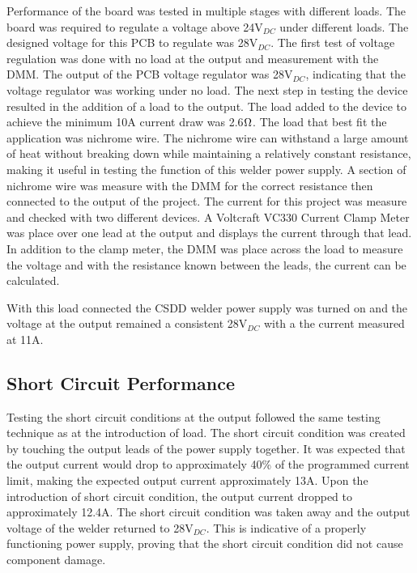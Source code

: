 \documentclass[11pt]{article}
\begin{document}
       Performance of the board was tested in multiple stages with different loads. The board was required to regulate a voltage above 24V$_{DC}$ under different loads. The designed voltage for this PCB to regulate was 28V$_{DC}$. The first test of voltage regulation was done with no load at the output and measurement with the DMM. The output of the PCB voltage regulator was 28V$_{DC}$, indicating that the voltage regulator was working under no load. The next step in testing the device resulted in the addition of a load to the output. The load added to the device to achieve the minimum 10A current draw was 2.6$\ohm$. The load that best fit the application was nichrome wire. The nichrome wire can withstand a large amount of heat without breaking down while maintaining a relatively constant resistance, making it useful in testing the function of this welder power supply. A section of nichrome wire was measure with the DMM for the correct resistance then connected to the output of the project. The current for this project was measure and checked with two different devices. A Voltcraft VC330 Current Clamp Meter was place over one lead at the output and displays the current through that lead. In addition to the clamp meter, the DMM was place across the load to measure the voltage and with the resistance known between the leads, the current can be calculated. 
       
       With this load connected the CSDD welder power supply was turned on and the voltage at the output remained a consistent 28V$_{DC}$ with a the current measured at 11A. 
        
    \subsection{Short Circuit Performance}
        Testing the short circuit conditions at the output followed the same testing technique as at the introduction of load. The short circuit condition was created by touching the output leads of the power supply together. It was expected that the output current would drop to approximately 40\% of the programmed current limit, making the expected output current approximately 13A. Upon the introduction of short circuit condition, the output current dropped to approximately 12.4A. The short circuit condition was taken away and the output voltage of the welder returned to 28V$_{DC}$. This is indicative of a properly functioning power supply, proving that the short circuit condition did not cause component damage.
        
\end{document}
